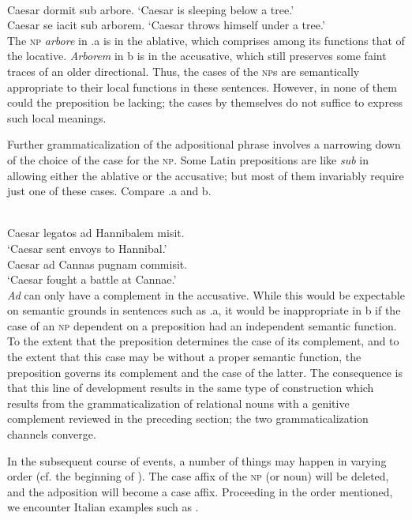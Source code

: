 \ea\label{ex:E71}
\\
\ea Caesar dormit sub arbore.
\glt ‘Caesar is sleeping below a tree.’\\
\ex Caesar se iacit sub arborem.
\glt ‘Caesar throws himself under a tree.’\\
\z
\z
\noindent \label{page99}The \textsc{np} \textit{arbore} in .a is in the ablative, which comprises among its functions that of the locative. \textit{Arborem} in b is in the accusative, which still preserves some faint traces of an older directional. Thus, the cases of the \textsc{np}s are semantically appropriate to their local functions in these sentences. However, in none of them could the preposition be lacking; the cases by themselves do not suffice to express such local meanings.

\label{page100c}Further grammaticalization of the adpositional phrase involves a narrowing down of the choice of the case for the \textsc{np}. Some Latin prepositions are like \textit{sub} in allowing either the ablative or the accusative; but most of them invariably require just one of these cases. Compare .a and b.

\ea\label{ex:E72}
 \\
 \ea  Caesar legatos ad Hannibalem misit.\\

\glt ‘Caesar sent envoys to Hannibal.’\\
\ex  Caesar ad Cannas pugnam commisit.\\
\glt ‘Caesar fought a battle at Cannae.’\\
\z
\z
\noindent \textit{Ad} can only have a complement in the accusative. While this would be expectable on semantic grounds in sentences such as .a, it would be inappropriate in b if the case of an \textsc{np} dependent on a preposition had an independent semantic function. To the extent that the preposition determines the case of its complement, and to the extent that this case may be without a proper semantic function, the preposition governs its complement and the case of the latter. The consequence is that this line of development results in the same type of construction which results from the grammaticalization of relational nouns with a genitive complement reviewed in the preceding section; the two grammaticalization channels converge.

In the subsequent course of events, a number of things may happen in varying order (cf. the beginning of ). The case affix of the \textsc{np} (or noun) will be deleted, and the adposition will become a case affix. Proceeding in the order mentioned, we encounter Italian examples such as .

